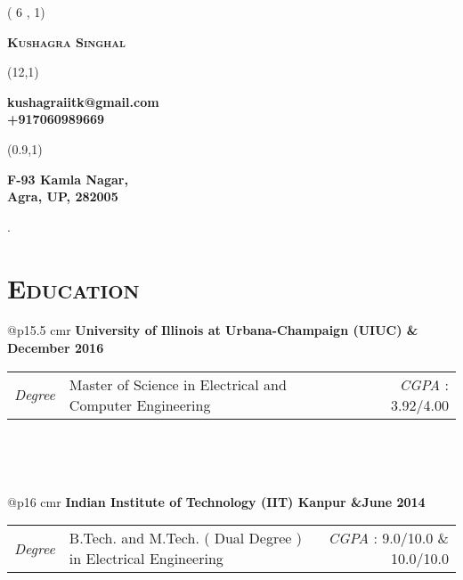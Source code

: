 \documentclass [letterpaper,10pt]{article}
\newcommand{\NewPart}[1]{\section*{\large\textsc{#1}}}
\begin{document}
\begin{textblock}{5}( 6 , 1)
\begin{flushleft}\textbf{{\LARGE \textsc{Kushagra Singhal}}}\end{flushleft}
\end{textblock}
\begin{textblock}{5}(12,1)
\begin{flushleft}\textbf{kushagraiitk@gmail.com\\[0pt]
+917060989669}\end{flushleft}
\end{textblock}
\begin{textblock}{5}(0.9,1)
	\begin{flushleft}\textbf{F-93 Kamla Nagar,\\[0pt]
			Agra, UP, 282005}\end{flushleft}
\end{textblock}
.
\vspace{25 pt}
\NewPart{Education}{}
\begin{tabular}{@{}p{15.5 cm}r}
	\bf{University of Illinois at Urbana-Champaign (UIUC)} & \hfill \textbf{December 2016} \\
	\begin{tabular}{p{2 cm} l r}
		\textit{Degree} &  Master of Science in Electrical and Computer Engineering & \textit{CGPA} : 3.92/4.00 \\ 
	\end{tabular}   \\
\end{tabular}\\
\begin{tabular}{@{}p{16 cm}r}
	\bf{Indian Institute of Technology (IIT) Kanpur} &\hfil \textbf{June 2014} \\
	\begin{tabular}{p{2 cm} l r}
		\textit{Degree} &  B.Tech. and M.Tech. ( Dual Degree ) in Electrical Engineering &      \textit{CGPA} : 9.0/10.0 \& 10.0/10.0 \\
	\end{tabular}   
\end{tabular} 
\end{document}
